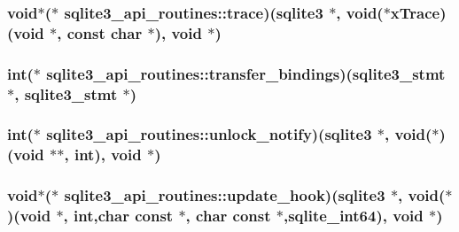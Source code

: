 \hypertarget{structsqlite3__api__routines_acfcae876299cbd94ea3c2da505f1ddc6}{
\subsubsection[{trace}]{\setlength{\rightskip}{0pt plus 5cm}void$\ast$($\ast$ sqlite3\-\_\-api\-\_\-routines\-::trace)({\bf sqlite3} $\ast$, void($\ast$x\-Trace)(void $\ast$, const char $\ast$), void $\ast$)}}\label{structsqlite3__api__routines_acfcae876299cbd94ea3c2da505f1ddc6}
\hypertarget{structsqlite3__api__routines_a76b183a79f69910802d39aa9898cef4e}{
\subsubsection[{transfer\-\_\-bindings}]{\setlength{\rightskip}{0pt plus 5cm}int($\ast$ sqlite3\-\_\-api\-\_\-routines\-::transfer\-\_\-bindings)({\bf sqlite3\-\_\-stmt} $\ast$, {\bf sqlite3\-\_\-stmt} $\ast$)}}\label{structsqlite3__api__routines_a76b183a79f69910802d39aa9898cef4e}
\hypertarget{structsqlite3__api__routines_aad63fcc63d8102991ba13bcb23d3d42c}{
\subsubsection[{unlock\-\_\-notify}]{\setlength{\rightskip}{0pt plus 5cm}int($\ast$ sqlite3\-\_\-api\-\_\-routines\-::unlock\-\_\-notify)({\bf sqlite3} $\ast$, void($\ast$)(void $\ast$$\ast$, int), void $\ast$)}}\label{structsqlite3__api__routines_aad63fcc63d8102991ba13bcb23d3d42c}
\hypertarget{structsqlite3__api__routines_af5b6c2adc3c5b6a2d6657ff609a67d35}{
\subsubsection[{update\-\_\-hook}]{\setlength{\rightskip}{0pt plus 5cm}void$\ast$($\ast$ sqlite3\-\_\-api\-\_\-routines\-::update\-\_\-hook)({\bf sqlite3} $\ast$, void($\ast$)(void $\ast$, int,char const $\ast$, char const $\ast$,{\bf sqlite\-\_\-int64}), void $\ast$)}}\label{structsqlite3__api__routines_af5b6c2adc3c5b6a2d6657ff609a67d35}

